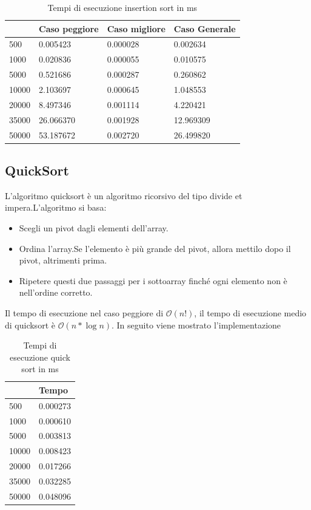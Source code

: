 \documentclass[12pt, a4paper]{report}
\begin{document}
\begin{table}[ht]
\centering
\begin{tabular}{| l | l | l | l |}
\hline
 & Caso peggiore & Caso migliore & Caso Generale \\ \hline
500 & 0.005423 & 0.000028 & 0.002634 \\ \hline
1000 & 0.020836	 & 0.000055 & 0.010575 \\ \hline
5000 & 0.521686 & 0.000287 & 0.260862 \\ \hline
10000 & 2.103697 & 0.000645 & 1.048553 \\ \hline
20000 & 8.497346 & 0.001114 & 4.220421 \\ \hline
35000 & 26.066370 & 0.001928 & 12.969309 \\ \hline
50000 & 53.187672 & 0.002720 & 26.499820 \\ \hline

\end{tabular}
\caption{Tempi di esecuzione insertion sort in ms}
\label{Tab:Tempi esecuzione InsertionSort}
\end{table}


\subsection{QuickSort}
L'algoritmo quicksort è un algoritmo ricorsivo del tipo divide et impera.L'algoritmo si basa:

\begin{itemize}
\item Scegli un pivot dagli elementi dell'array.
\item Ordina l'array.Se l'elemento è più grande del pivot, allora mettilo dopo il pivot, altrimenti prima.
\item Ripetere questi due passaggi per i sottoarray finché ogni elemento non è nell'ordine corretto.
\end{itemize}

Il tempo di esecuzione nel caso peggiore di $\mathcal{O}(n!) $, il tempo di esecuzione medio di quicksort è $\mathcal{O}(n * \log{}n) $. In seguito viene mostrato l'implementazione 

	

\begin{table}[ht]
\centering
\begin{tabular}{| l | l |}
\hline
 & Tempo \\ \hline
500 & 0.000273 \\ \hline
1000 & 0.000610 \\ \hline
5000 & 0.003813 \\ \hline
10000 & 0.008423 \\ \hline
20000 & 0.017266 \\ \hline
35000 & 0.032285 \\ \hline
50000 & 0.048096 \\ \hline

\end{tabular}
\caption{Tempi di esecuzione quick sort in ms}
\label{Tab:Tempi esecuzione QuickSort}
\end{table}
\end{document}
